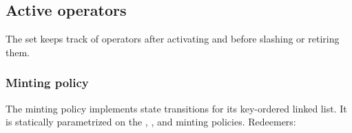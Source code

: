 \documentclass[../midgard.tex]{subfiles}
\begin{document}
\subsection{Active operators}
\label{h:active-operators}

The  set keeps track of operators after activating and before slashing or retiring them.

\subsubsection{Minting policy}
\label{h:active-operators-minting-policy}

The  minting policy implements state transitions for its key-ordered linked list.
It is statically parametrized on the , , and  minting policies.
Redeemers:
\end{document}
